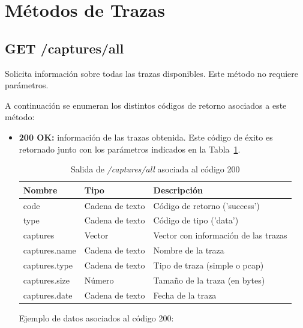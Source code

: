 \section{Métodos de Trazas \label{extra:api:trazas}}

%
%
\subsection{GET /captures/all}
Solicita información sobre todas las \glspl{traza} disponibles.
Este método no requiere parámetros.

A continuación se enumeran los distintos códigos de retorno asociados a este método:
\begin{itemize}

\item{\textbf{200 OK:} información de las \glspl{traza} obtenida.
Este código de éxito es retornado junto con los parámetros indicados en la Tabla~\ref{extra:api:capturesall:ok}.
\begin{table}[H]
\centering
\begin{tabular}{|l|l|l|}
\hline
\rowcolor[HTML]{F5F5F5}
\textbf{Nombre}                & \textbf{Tipo}   & \textbf{Descripción}                            \\ \hline
code                           & Cadena de texto & Código de retorno ('success')                   \\ \hline
type                           & Cadena de texto & Código de tipo ('data')                         \\ \hline
captures                       & Vector          & Vector con información de las \glspl{traza}     \\ \hline
captures.name                  & Cadena de texto & Nombre de la \gls{traza}                        \\ \hline
captures.type                  & Cadena de texto & Tipo de \gls{traza} (\gls{simple} o \gls{pcap}) \\ \hline
captures.size                  & Número          & Tamaño de la \gls{traza} (en bytes)             \\ \hline
captures.date                  & Cadena de texto & Fecha de la \gls{traza}                         \\ \hline
\end{tabular}
\caption{Salida de \textit{/captures/all} asociada al código 200}
\label{extra:api:capturesall:ok}
\end{table}
\begin{minipage}{\textwidth}
Ejemplo de datos asociados al código 200:


\end{minipage}}
\end{itemize}
